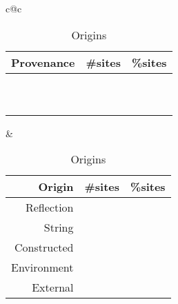 \documentclass[acmsmall, screen]{acmart}
\begin{document}
\begin{table}[!b]\small\centering
\begin{tabular}{c@{\hspace{2cm}}c}
  \begin{tabular}{lcc}\toprule
\bf Provenance & \bf \#sites & \bf \%sites \\\midrule
		\packageProvenanceNamea & \packageNbProvenanceSitesa & \packagePercentProvenanceSitesa \\
		\packageProvenanceNameb & \packageNbProvenanceSitesb & \packagePercentProvenanceSitesb \\
		\packageProvenanceNamec & \packageNbProvenanceSitesc & \packagePercentProvenanceSitesc \\
		\packageProvenanceNamee & \packageNbProvenanceSitese & \packagePercentProvenanceSitese \\
		\packageProvenanceNamef & \packageNbProvenanceSitesf & \packagePercentProvenanceSitesf \\
		\packageProvenanceNameg & \packageNbProvenanceSitesg & \packagePercentProvenanceSitesg \\
		\packageProvenanceNameh & \packageNbProvenanceSitesh & \packagePercentProvenanceSitesh \\
		\packageProvenanceNamei & \packageNbProvenanceSitesi & \packagePercentProvenanceSitesi \\
		\packageProvenanceNamel & \packageNbProvenanceSitesl & \packagePercentProvenanceSitesl \\
		\packageProvenanceNamen & \packageNbProvenanceSitesn & \packagePercentProvenanceSitesn \\\bottomrule
\end{tabular}
&
\begin{tabular}{rrr} \toprule
\bf Origin  & \bf \#sites & \bf \%sites \\\midrule
Reflection &  \packageNbReflectionSites & \packageReflectionSitesPercent\\
String & \packageNbStringSites & \packageStringSitesPercent \\
Constructed & \packageNbConstructedSites & \packageConstructedSitesPercent \\
Environment & \packageNbSymbolSites & \packageSymbolSitesPercent \\
External & \packageNbExternalSites & \packageExternalSitesPercent \\\bottomrule
\end{tabular}
\end{tabular}
\medskip
\caption{Origins}\label{tab:provenance}
\end{table}
\end{document}
